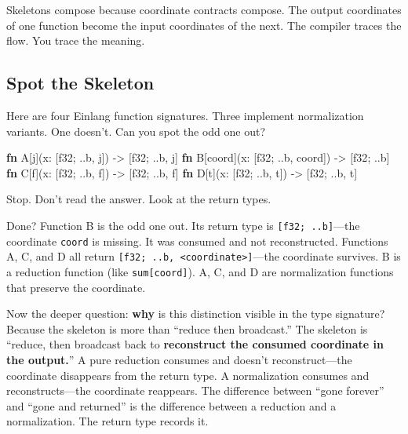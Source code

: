 \documentclass[11pt,titlepage]{article}
\newenvironment{Shaded}{}{}
\newcommand{\DataTypeTok}[1]{\textcolor[rgb]{0.56,0.13,0.00}{#1}}
\newcommand{\KeywordTok}[1]{\textcolor[rgb]{0.00,0.44,0.13}{\textbf{#1}}}
\newcommand{\NormalTok}[1]{#1}
\newcommand{\OperatorTok}[1]{\textcolor[rgb]{0.40,0.40,0.40}{#1}}
\begin{document}
Skeletons compose because coordinate contracts compose. The output
coordinates of one function become the input coordinates of the next.
The compiler traces the flow. You trace the meaning.

\vspace{2em}

\hypertarget{spot-the-skeleton}{%
\subsection{Spot the Skeleton}\label{spot-the-skeleton}}

Here are four Einlang function signatures. Three implement normalization
variants. One doesn't. Can you spot the odd one out?

\begin{Shaded}
\begin{Highlighting}[]
\KeywordTok{fn}\NormalTok{ A[j](x: }\OperatorTok{[}\DataTypeTok{f32}\NormalTok{; ..b, j}\OperatorTok{]}\NormalTok{) -> }\OperatorTok{[}\DataTypeTok{f32}\NormalTok{; ..b, j}\OperatorTok{]}
\KeywordTok{fn}\NormalTok{ B[coord](x: }\OperatorTok{[}\DataTypeTok{f32}\NormalTok{; ..b, coord}\OperatorTok{]}\NormalTok{) -> }\OperatorTok{[}\DataTypeTok{f32}\NormalTok{; ..b}\OperatorTok{]}
\KeywordTok{fn}\NormalTok{ C[f](x: }\OperatorTok{[}\DataTypeTok{f32}\NormalTok{; ..b, f}\OperatorTok{]}\NormalTok{) -> }\OperatorTok{[}\DataTypeTok{f32}\NormalTok{; ..b, f}\OperatorTok{]}
\KeywordTok{fn}\NormalTok{ D[t](x: }\OperatorTok{[}\DataTypeTok{f32}\NormalTok{; ..b, t}\OperatorTok{]}\NormalTok{) -> }\OperatorTok{[}\DataTypeTok{f32}\NormalTok{; ..b, t}\OperatorTok{]}
\end{Highlighting}
\end{Shaded}

Stop. Don't read the answer. Look at the return types.

Done? Function B is the odd one out. Its return type is
\texttt{{[}f32;\ ..b{]}}---the coordinate \texttt{coord} is missing. It
was consumed and not reconstructed. Functions A, C, and D all return
\texttt{{[}f32;\ ..b,\ \textless{}coordinate\textgreater{}{]}}---the
coordinate survives. B is a reduction function (like
\texttt{sum{[}coord{]}}). A, C, and D are normalization functions that
preserve the coordinate.

Now the deeper question: \textbf{why} is this distinction visible in the
type signature? Because the skeleton is more than ``reduce then
broadcast.'' The skeleton is ``reduce, then broadcast back to
\textbf{reconstruct the consumed coordinate in the output.}'' A pure
reduction consumes and doesn't reconstruct---the coordinate disappears
from the return type. A normalization consumes and reconstructs---the
coordinate reappears. The difference between ``gone forever'' and ``gone
and returned'' is the difference between a reduction and a
normalization. The return type records it.
\end{document}
